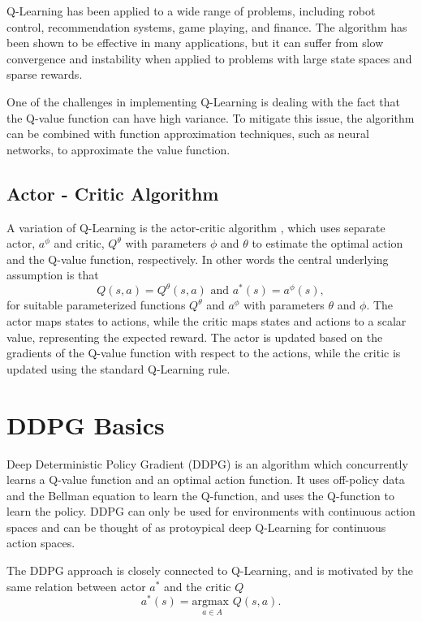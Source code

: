 Q-Learning has been applied to a wide range of problems, including robot control, recommendation systems, game playing, and finance. The algorithm has been shown to be effective in many applications, but it can suffer from slow convergence and instability when applied to problems with large state spaces and sparse rewards.


One of the challenges in implementing Q-Learning is dealing with the fact that the Q-value function can have high variance. To mitigate this issue, the algorithm can be combined with function approximation techniques, such as neural networks, to approximate the value function.

\subsection{Actor - Critic Algorithm}
A variation of Q-Learning is the actor-critic algorithm \cite{konda2000actor}, which uses separate actor, $a^\phi$ and critic, $Q^\theta$ with parameters $\phi$ and $\theta$ to estimate the optimal action and the Q-value function, respectively. In other words the central underlying assumption is that $$Q(s,a) = Q^\theta(s,a)  \text{ and } a^*(s)=a^\phi(s),$$  for suitable parameterized functions $Q^\theta$ and $a^\phi$ with parameters $\theta$ and $\phi$. The actor maps states to actions, while the critic maps states and actions to a scalar value, representing the expected reward. The actor is updated based on the gradients of the Q-value function with respect to the actions, while the critic is updated using the standard Q-Learning rule. 



\section{DDPG Basics}

Deep Deterministic Policy Gradient (DDPG) is an algorithm which concurrently learns a Q-value function and an optimal action function. It uses off-policy data and the Bellman equation to learn the Q-function, and uses the Q-function to learn the policy. DDPG can only be used for environments with continuous action spaces and can be thought of as protoypical deep Q-Learning for continuous action spaces.

The DDPG approach is closely connected to Q-Learning, and is motivated by the same relation between actor $a^{\ast}$ and the critic $Q$
\begin{equation}\label{equation:Q Learning}
a^*(s) = \underset{a \in A}{\text{argmax }} Q(s,a).
\end{equation}


